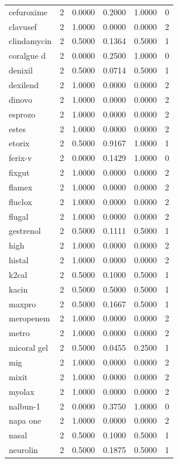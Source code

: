 \begin{longtable}{p{3.0cm}rrrrr}
cefuroxime & 2 & 0.0000 & 0.2000 & 1.0000 & 0 \\
clavusef & 2 & 1.0000 & 0.0000 & 0.0000 & 2 \\
clindamycin & 2 & 0.5000 & 0.1364 & 0.5000 & 1 \\
coralgue d & 2 & 0.0000 & 0.2500 & 1.0000 & 0 \\
denixil & 2 & 0.5000 & 0.0714 & 0.5000 & 1 \\
dexilend & 2 & 1.0000 & 0.0000 & 0.0000 & 2 \\
dinovo & 2 & 1.0000 & 0.0000 & 0.0000 & 2 \\
esprozo & 2 & 1.0000 & 0.0000 & 0.0000 & 2 \\
estes & 2 & 1.0000 & 0.0000 & 0.0000 & 2 \\
etorix & 2 & 0.5000 & 0.9167 & 1.0000 & 1 \\
ferix-v & 2 & 0.0000 & 0.1429 & 1.0000 & 0 \\
fixgut & 2 & 1.0000 & 0.0000 & 0.0000 & 2 \\
flamex & 2 & 1.0000 & 0.0000 & 0.0000 & 2 \\
fluclox & 2 & 1.0000 & 0.0000 & 0.0000 & 2 \\
flugal & 2 & 1.0000 & 0.0000 & 0.0000 & 2 \\
gestrenol & 2 & 0.5000 & 0.1111 & 0.5000 & 1 \\
high & 2 & 1.0000 & 0.0000 & 0.0000 & 2 \\
histal & 2 & 1.0000 & 0.0000 & 0.0000 & 2 \\
k2cal & 2 & 0.5000 & 0.1000 & 0.5000 & 1 \\
kacin & 2 & 0.5000 & 0.5000 & 0.5000 & 1 \\
maxpro & 2 & 0.5000 & 0.1667 & 0.5000 & 1 \\
meropenem & 2 & 1.0000 & 0.0000 & 0.0000 & 2 \\
metro & 2 & 1.0000 & 0.0000 & 0.0000 & 2 \\
micoral gel & 2 & 0.5000 & 0.0455 & 0.2500 & 1 \\
mig & 2 & 1.0000 & 0.0000 & 0.0000 & 2 \\
mixit & 2 & 1.0000 & 0.0000 & 0.0000 & 2 \\
myolax & 2 & 1.0000 & 0.0000 & 0.0000 & 2 \\
nalbun-1 & 2 & 0.0000 & 0.3750 & 1.0000 & 0 \\
napa one & 2 & 1.0000 & 0.0000 & 0.0000 & 2 \\
nasal & 2 & 0.5000 & 0.1000 & 0.5000 & 1 \\
neurolin & 2 & 0.5000 & 0.1875 & 0.5000 & 1 \\

\end{longtable}
